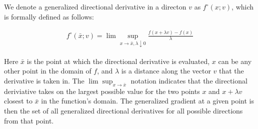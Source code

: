 
We denote a generalized directional derivative in a directon $v$ as $f^\circ \left(x;v\right)$, which is formally defined as follows:

\vspace{-10pt}\begin{align}
  f^\circ \left(\bar{x}; v\right) = \lim \sup_{x \rightarrow \bar{x}, \lambda \downarrow 0} \frac{f\left(x + \lambda v\right) - f\left(x\right)}{\lambda}
\end{align}

\noindent Here $\bar{x}$ is the point at which the directional derivative is evaluated, $x$ can be any other point in the domain of $f$, and $\lambda$ is a distance along the vector $v$ that the derivative is taken in. The $\lim \sup_{x \rightarrow \bar{x}}$ notation indicates that the directional deriviative takes on the largest possible value for the two points $x$ and $x+\lambda v$ closest to $\bar{x}$ in the function's domain. The generalized gradient at a given point is then the set of all generalized directional derivatives for all possible directions from that point.

